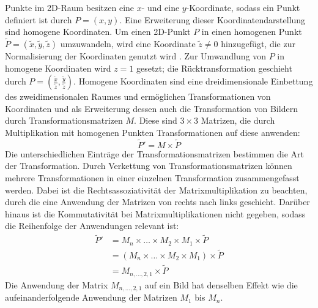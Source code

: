 Punkte im 2D-Raum besitzen eine $x$- und eine $y$-Koordinate, sodass ein Punkt definiert ist durch $P = (x, y)$. Eine Erweiterung dieser Koordinatendarstellung sind homogene Koordinaten. Um einen 2D-Punkt $P$ in einen homogenen Punkt $\widetilde{P} = (\widetilde{x}, \widetilde{y}, \widetilde{z})$ umzuwandeln, wird eine Koordinate $\widetilde{z} \neq 0$ hinzugefügt, die zur Normalisierung der Koordinaten genutzt wird \cite{cv_general}. Zur Umwandlung von $P$ in homogene Koordinaten wird $z=1$ gesetzt; die Rücktransformation geschieht durch $P = (\frac{\widetilde{x}}{\widetilde{z}}, \frac{\widetilde{y}}{\widetilde{z}})$. Homogene Koordinaten sind eine dreidimensionale Einbettung des zweidimensionalen Raumes und ermöglichen Transformationen von Koordinaten und als Erweiterung dessen auch die Transformation von Bildern durch Transformationsmatrizen $M$. Diese sind $3 \times 3$ Matrizen, die durch Multiplikation mit homogenen Punkten Transformationen auf diese anwenden:
\[ \widetilde{P}' = M \times \widetilde{P} \]
Die unterschiedlichen Einträge der Transformationsmatrizen bestimmen die Art der Transformation. Durch Verkettung von Transformationsmatrizen können mehrere Transformationen in einer einzelnen Transformation zusammengefasst werden. Dabei ist die Rechtsassoziativität der Matrixmultiplikation zu beachten, durch die eine Anwendung der Matrizen von rechts nach links geschieht. Darüber hinaus ist die Kommutativität bei Matrixmultiplikationen nicht gegeben, sodass die Reihenfolge der Anwendungen relevant ist:
{\setlength{\belowdisplayskip}{0.5ex}
\begin{align*}
    \widetilde{P}' & = M_n \times \dots \times M_2 \times M_1 \times \widetilde{P}   \\
                   & = (M_n \times \dots \times M_2 \times M_1) \times \widetilde{P} \\
                   & = M_{n, \dots, 2, 1} \times \widetilde{P}
\end{align*}}
Die Anwendung der Matrix $M_{n, \dots, 2, 1}$ auf ein Bild hat denselben Effekt wie die aufeinanderfolgende Anwendung der Matrizen $M_1$ bis $M_n$.


